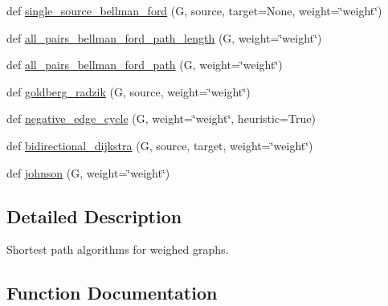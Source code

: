 \begin{DoxyCompactItemize}
def \hyperlink{namespacenetworkx_1_1algorithms_1_1shortest__paths_1_1weighted_a8c0ea1b941fbc772ac500e47c6fbbf06}{single\+\_\+source\+\_\+bellman\+\_\+ford} (G, source, target=None, weight=\char`\"{}weight\char`\"{})
\item 
def \hyperlink{namespacenetworkx_1_1algorithms_1_1shortest__paths_1_1weighted_a936c1f63a5a5699a63900f569a9cc9b0}{all\+\_\+pairs\+\_\+bellman\+\_\+ford\+\_\+path\+\_\+length} (G, weight=\char`\"{}weight\char`\"{})
\item 
def \hyperlink{namespacenetworkx_1_1algorithms_1_1shortest__paths_1_1weighted_a425f04d53d403563a733dc77b1c7cd24}{all\+\_\+pairs\+\_\+bellman\+\_\+ford\+\_\+path} (G, weight=\char`\"{}weight\char`\"{})
\item 
def \hyperlink{namespacenetworkx_1_1algorithms_1_1shortest__paths_1_1weighted_a5d375c09123fa049e92db19e16ce57fd}{goldberg\+\_\+radzik} (G, source, weight=\char`\"{}weight\char`\"{})
\item 
def \hyperlink{namespacenetworkx_1_1algorithms_1_1shortest__paths_1_1weighted_adfecc0f26108aa59e45335af3a3c4357}{negative\+\_\+edge\+\_\+cycle} (G, weight=\char`\"{}weight\char`\"{}, heuristic=True)
\item 
def \hyperlink{namespacenetworkx_1_1algorithms_1_1shortest__paths_1_1weighted_a4eb8421faed983fc247d9ad2e789645d}{bidirectional\+\_\+dijkstra} (G, source, target, weight=\char`\"{}weight\char`\"{})
\item 
def \hyperlink{namespacenetworkx_1_1algorithms_1_1shortest__paths_1_1weighted_a8b33735d56c0db02c1126dd8eed79650}{johnson} (G, weight=\char`\"{}weight\char`\"{})
\end{DoxyCompactItemize}


\subsection{Detailed Description}
\begin{DoxyVerb}Shortest path algorithms for weighed graphs.
\end{DoxyVerb}
 

\subsection{Function Documentation}
\mbox{\label{namespacenetworkx_1_1algorithms_1_1shortest__paths_1_1weighted_a425f04d53d403563a733dc77b1c7cd24}} 
